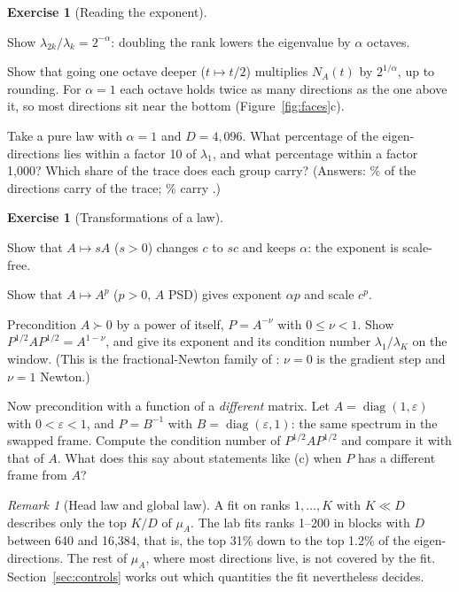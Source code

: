 \documentclass[11pt,a4paper]{article}
\DeclareMathOperator{\diag}{diag}
\newcommand{\study}[1]{\path{#1}}
\theoremstyle{plain}
\theoremstyle{definition}
\newtheorem{exercise}[proposition]{Exercise}
\theoremstyle{remark}
\newtheorem{remark}[proposition]{Remark}
\begin{document}
\begin{exercise}[Reading the exponent]\label{ex:reading}
\begin{steps}
\item Show $\lambda_{2k}/\lambda_k=2^{-\alpha}$: doubling the rank lowers the eigenvalue by $\alpha$ octaves.
\item Show that going one octave deeper ($t\mapsto t/2$) multiplies $N_A(t)$ by $2^{1/\alpha}$, up to rounding. For
  $\alpha=1$ each octave holds twice as many directions as the one above it, so most directions sit near the bottom
  (Figure~\ref{fig:faces}c).
\item Take a pure law with $\alpha=1$ and $D=4{,}096$. What percentage of the eigen-directions lies within a factor
  10 of $\lambda_1$, and what percentage within a factor 1{,}000? Which share of the trace does each group carry?
  (Answers: \NumDirWithinTen\% of the directions carry \NumTraceWithinTen{} of the trace; \NumDirWithinThousand\%
  carry \NumTraceWithinThousand.)
\end{steps}
\end{exercise}

\begin{exercise}[Transformations of a law]\label{ex:transform}
\begin{steps}
\item Show that $A\mapsto sA$ ($s>0$) changes $c$ to $sc$ and keeps $\alpha$: the exponent is scale-free.
\item Show that $A\mapsto A^p$ ($p>0$, $A$ PSD) gives exponent $\alpha p$ and scale $c^p$.
\item Precondition $A\succ0$ by a power of itself, $P=A^{-\nu}$ with $0\le\nu<1$. Show $P^{1/2}AP^{1/2}=A^{1-\nu}$,
  and give its exponent and its condition number $\lambda_1/\lambda_K$ on the window. (This is the fractional-Newton
  family of \study{noise_scale_20261021}: $\nu=0$ is the gradient step and $\nu=1$ Newton.)
\item Now precondition with a function of a \emph{different} matrix. Let $A=\diag(1,\varepsilon)$ with
  $0<\varepsilon<1$, and $P=B^{-1}$ with $B=\diag(\varepsilon,1)$: the same spectrum in the swapped frame. Compute
  the condition number of $P^{1/2}AP^{1/2}$ and compare it with that of $A$. What does this say about statements like
  (c) when $P$ has a different frame from $A$?
\end{steps}
\end{exercise}

\begin{remark}[Head law and global law]\label{rem:window}
A fit on ranks $1,\dots,K$ with $K\ll D$ describes only the top $K/D$ of $\mu_A$. The lab fits ranks 1--200 in
blocks with $D$ between 640 and 16{,}384, that is, the top 31\% down to the top 1.2\% of the eigen-directions. The
rest of $\mu_A$, where most directions live, is not covered by the fit. Section~\ref{sec:controls} works out which
quantities the fit nevertheless decides.
\end{remark}
\end{document}
